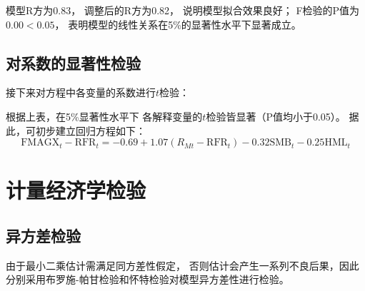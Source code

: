 \documentclass[UTF8]{ctexart}
\begin{document}
模型R方为0.83，
调整后的R方为0.82，
说明模型拟合效果良好；
F检验的P值为$0.00<0.05$，
表明模型的线性关系在5\%的显著性水平下显著成立。

\subsection{对系数的显著性检验}

接下来对方程中各变量的系数进行$t$检验：


根据上表，在5\%显著性水平下
各解释变量的$t$检验皆显著（P值均小于0.05）。
据此，可初步建立回归方程如下：
\begin{equation}
  \text{FMAGX}_t-\mathrm{RFR}_t=-0.69+1.07\left( R_{Mt}-\mathrm{RFR}_t \right) -0.32\mathrm{SMB}_t-0.25\mathrm{HML}_t
\end{equation}





\section{计量经济学检验}





\subsection{异方差检验}

由于最小二乘估计需满足同方差性假定，
否则估计会产生一系列不良后果，因此
分别采用布罗施-帕甘检验和怀特检验对模型异方差性进行检验。
\end{document}
